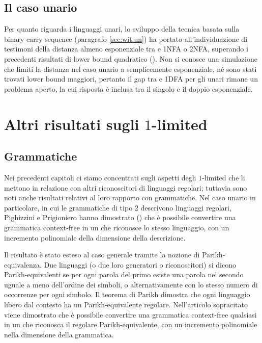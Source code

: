 \subsection{Il caso unario}
Per quanto riguarda i linguaggi unari, lo sviluppo della tecnica basata sulla binary carry sequence (paragrafo \ref{sec:wit:un}) ha portato all'individuazione di testimoni della distanza almeno esponenziale tra  e 1NFA o 2NFA, superando i precedenti risultati di lower bound quadratico (\cite{Pighizzini:14:limitedRE}). Non si conosce una simulazione che limiti la distanza nel caso unario a semplicemente esponenziale, né sono stati trovati lower bound maggiori, pertanto il gap tra  e 1DFA per gli unari rimane un problema aperto, la cui risposta è inclusa tra il singolo e il doppio esponenziale.



\section{Altri risultati sugli \texorpdfstring{$1$-limited}{1-limited}}


\subsection{Grammatiche}
Nei precedenti capitoli ci siamo concentrati sugli aspetti degli $1$-limited che li mettono in relazione con altri riconoscitori di linguaggi regolari; tuttavia sono noti anche risultati relativi al loro rapporto con grammatiche. Nel caso unario in particolare, in cui le grammatiche di tipo $2$ descrivono linguaggi regolari, Pighizzini e Prigioniero hanno dimostrato (\cite{Pighizzini:19:limitedunary}) che è possibile convertire una grammatica context-free in un  che riconosce lo stesso linguaggio, con un incremento polinomiale della dimensione della descrizione.

Il risultato è stato esteso al caso generale tramite la nozione di Parikh-equivalenza. Due linguaggi (o due loro generatori o riconoscitori) si dicono Parikh-equivalenti se per ogni parola del primo esiste una parola nel secondo uguale a meno dell'ordine dei simboli, o alternativamente con lo stesso numero di occorrenze per ogni simbolo. Il teorema di Parikh dimostra che ogni linguaggio libero dal contesto ha un Parikh-equivalente regolare. Nell'articolo sopracitato viene dimostrato che è possibile convertire una grammatica context-free qualsiasi in un  che riconosca il regolare Parikh-equivalente, con un incremento polinomiale nella dimensione della grammatica.


